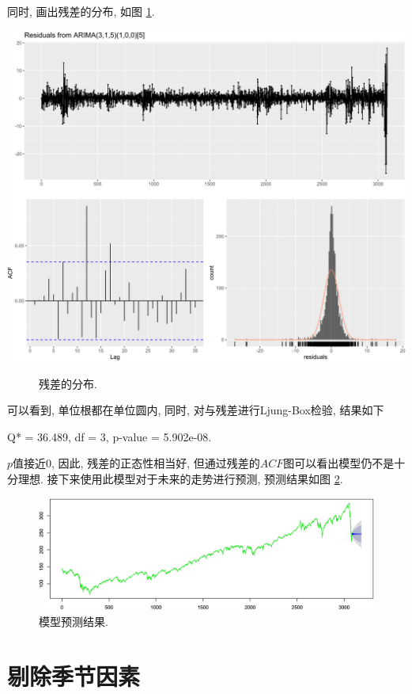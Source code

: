 \documentclass[11pt]{article}
\begin{document}
同时, 画出残差的分布, 如图 \ref{fig:m1res1}.
\begin{center}
    \hspace{-10pt}\includegraphics[width=.8\textwidth]{m1res1}
\end{center}
\begin{figure}[htbp]
    \centering
    \caption{残差的分布. \label{fig:m1res1}}
\end{figure}

\qquad 可以看到, 单位根都在单位圆内, 同时, 对与残差进行Ljung-Box检验, 结果如下
\begin{center}
    Q* = 36.489, df = 3, p-value = 5.902e-08.
\end{center}
$p$值接近0, 因此, 残差的正态性相当好, 但通过残差的$ACF$图可以看出模型仍不是十分理想. 接下来使用此模型对于未来的走势进行预测, 预测结果如图 \ref{fig:7}.
\begin{figure}
    \centering
    \includegraphics[width=.8\textwidth]{f}
    \caption{模型预测结果. \label{fig:7}}
\end{figure}







\section{剔除季节因素}
\end{document}
